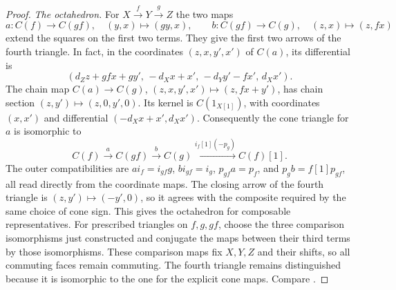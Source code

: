 \begin{proof}
\emph{The octahedron.} For \(X\xrightarrow{f}Y\xrightarrow{g}Z\)
the two maps
\[
 a:C(f)\to C(gf),\quad (y,x)\mapsto(gy,x),\qquad
 b:C(gf)\to C(g),\quad (z,x)\mapsto(z,fx)
\]
extend the squares on the first two terms. They give the first two
arrows of the fourth triangle. In fact, in the coordinates
\((z,x,y',x')\) of \(C(a)\), its differential is
\[
 (d_Zz+gfx+gy',\,-d_Xx+x',\,-d_Yy'-fx',\,d_Xx').
\]
The chain map \(C(a)\to C(g)\), \((z,x,y',x')\mapsto(z,fx+y')\),
has chain section \((z,y')\mapsto(z,0,y',0)\). Its kernel is
\(C(1_{X[1]})\), with coordinates \((x,x')\) and differential
\((-d_Xx+x',d_Xx')\). Consequently the cone triangle for \(a\) is
isomorphic to
\[
 C(f)\xrightarrow{a}C(gf)\xrightarrow{b}C(g)
   \xrightarrow{i_f[1](-p_g)}C(f)[1].
\]
The outer compatibilities are \(a i_f=i_{gf}g\),
\(b i_{gf}=i_g\), \(p_{gf}a=p_f\), and \(p_g b=f[1]p_{gf}\),
all read directly from the coordinate maps. The closing arrow of the
fourth triangle is \((z,y')\mapsto(-y',0)\), so it agrees with the
composite required by the same choice of cone sign. This gives the
octahedron for composable representatives. For prescribed triangles
on \(f,g,gf\), choose the three comparison isomorphisms just constructed
and conjugate the maps between their third terms by those
isomorphisms. These comparison maps fix \(X,Y,Z\) and their shifts,
so all commuting faces remain commuting. The fourth triangle remains
distinguished because it is isomorphic to the one for the explicit
cone maps. Compare \cite[Tags 014C, 014Q, and 014S]{stacks-derived}.
\end{proof}

